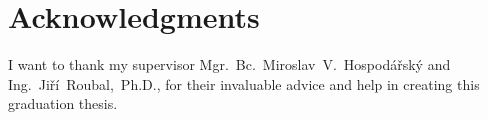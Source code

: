 ﻿\vfill

\section*{Acknowledgments}
I want to thank my supervisor Mgr.~Bc.~Miroslav~V.~Hospodářský and Ing.~Jiří~Roubal,~Ph.D., for their  invaluable advice and help in creating this graduation thesis.

\vglue 2cm $ $


